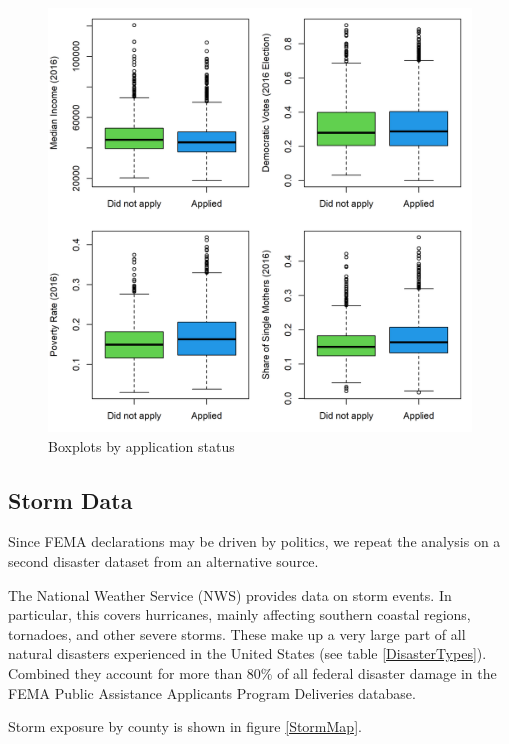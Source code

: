 \begin{figure}[!h]
	\centering
	\includegraphics[scale=1]{"../Code & Data/AssistanceCovBoxplot.png"}
	\caption{Boxplots by application status}
	\label{AssistCovBoxplot}
\end{figure}


\subsection{Storm Data}

Since FEMA declarations may be driven by politics, we repeat the analysis on a second disaster dataset from an alternative source.

The National Weather Service (NWS) provides data on storm events. In particular, this covers hurricanes, mainly affecting southern coastal regions, tornadoes, and other severe storms. These make up a very large part of all natural disasters experienced in the United States (see table \ref{DisasterTypes}). Combined they account for more than 80\% of all federal disaster damage in the FEMA Public Assistance Applicants Program Deliveries database.

Storm exposure by county is shown in figure \ref{StormMap}.

